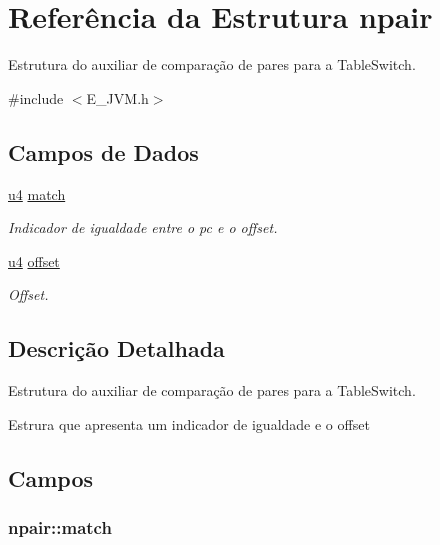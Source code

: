 \hypertarget{structnpair}{}\section{Referência da Estrutura npair}
\label{structnpair}


Estrutura do auxiliar de comparação de pares para a Table\+Switch.  




{\ttfamily \#include $<$E\+\_\+\+J\+V\+M.\+h$>$}

\subsection*{Campos de Dados}
\begin{DoxyCompactItemize}
\item 
\hyperlink{_e___j_v_m_8h_aedf6ddc03df8caaaccbb4c60b9a9b850}{u4} \hyperlink{structnpair_a638cc0bffebe3504c92ff603b2878625}{match}
\begin{DoxyCompactList}\small\item\em Indicador de igualdade entre o pc e o offset. \end{DoxyCompactList}\item 
\hyperlink{_e___j_v_m_8h_aedf6ddc03df8caaaccbb4c60b9a9b850}{u4} \hyperlink{structnpair_a333020fa37335ccefe10f2050b24ca6a}{offset}
\begin{DoxyCompactList}\small\item\em Offset. \end{DoxyCompactList}\end{DoxyCompactItemize}


\subsection{Descrição Detalhada}
Estrutura do auxiliar de comparação de pares para a Table\+Switch. 

Estrura que apresenta um indicador de igualdade e o offset 

\subsection{Campos}
\hypertarget{structnpair_a638cc0bffebe3504c92ff603b2878625}{}
\subsubsection[{match}]{ npair\+::match}\label{structnpair_a638cc0bffebe3504c92ff603b2878625}


